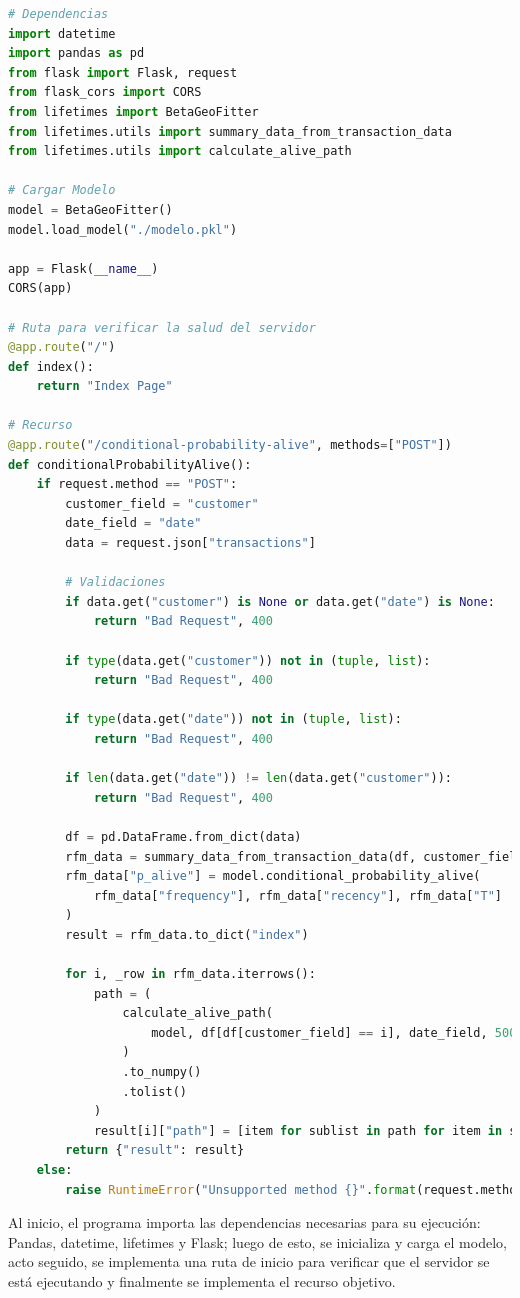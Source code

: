 \begin{lstlisting}[language=Python, caption=main.py]
# Dependencias
import datetime
import pandas as pd
from flask import Flask, request
from flask_cors import CORS
from lifetimes import BetaGeoFitter
from lifetimes.utils import summary_data_from_transaction_data
from lifetimes.utils import calculate_alive_path

# Cargar Modelo
model = BetaGeoFitter()
model.load_model("./modelo.pkl")

app = Flask(__name__)
CORS(app)

# Ruta para verificar la salud del servidor
@app.route("/")
def index():
    return "Index Page"

# Recurso
@app.route("/conditional-probability-alive", methods=["POST"])
def conditionalProbabilityAlive():
    if request.method == "POST":
        customer_field = "customer"
        date_field = "date"
        data = request.json["transactions"]

        # Validaciones
        if data.get("customer") is None or data.get("date") is None:
            return "Bad Request", 400

        if type(data.get("customer")) not in (tuple, list):
            return "Bad Request", 400

        if type(data.get("date")) not in (tuple, list):
            return "Bad Request", 400

        if len(data.get("date")) != len(data.get("customer")):
            return "Bad Request", 400

        df = pd.DataFrame.from_dict(data)
        rfm_data = summary_data_from_transaction_data(df, customer_field, date_field)
        rfm_data["p_alive"] = model.conditional_probability_alive(
            rfm_data["frequency"], rfm_data["recency"], rfm_data["T"]
        )
        result = rfm_data.to_dict("index")

        for i, _row in rfm_data.iterrows():
            path = (
                calculate_alive_path(
                    model, df[df[customer_field] == i], date_field, 500
                )
                .to_numpy()
                .tolist()
            )
            result[i]["path"] = [item for sublist in path for item in sublist]
        return {"result": result}
    else:
        raise RuntimeError("Unsupported method {}".format(request.method))
\end{lstlisting}	

Al inicio, el programa importa las dependencias necesarias para su ejecución: Pandas, datetime, lifetimes y Flask; luego de esto, se inicializa y carga el modelo, acto seguido, se implementa una ruta de inicio para verificar que el servidor se está ejecutando y finalmente se implementa el recurso objetivo.

